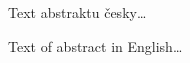 \startAbstractCz







  Text abstraktu česky\dots
\stopAbstractCz

\startAbstractEn
  Text of abstract in English\dots
\stopAbstractEn

\endinput
